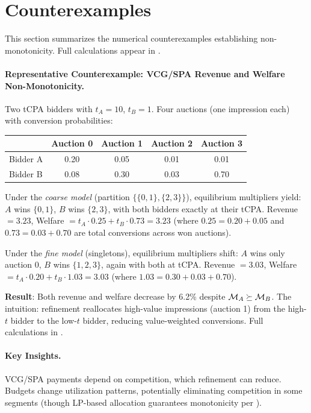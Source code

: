 
\section{Counterexamples}
\label{sec:counterexamples}

This section summarizes the numerical counterexamples establishing non-monotonicity. Full calculations appear in .

\paragraph{Representative Counterexample: VCG/SPA Revenue and Welfare Non-Monotonicity.}
Two tCPA bidders with $t_A = 10$, $t_B = 1$. Four auctions (one impression each) with conversion probabilities:
\begin{center}
\begin{small}
\begin{tabular}{lcccc}
\toprule
& Auction 0 & Auction 1 & Auction 2 & Auction 3 \\
\midrule
Bidder A & 0.20 & 0.05 & 0.01 & 0.01 \\
Bidder B & 0.08 & 0.30 & 0.03 & 0.70 \\
\bottomrule
\end{tabular}
\end{small}
\end{center}

Under the \emph{coarse model} (partition $\{\{0,1\}, \{2,3\}\}$), equilibrium multipliers yield: $A$ wins $\{0,1\}$, $B$ wins $\{2,3\}$, with both bidders exactly at their tCPA. Revenue $= 3.23$, Welfare $= t_A \cdot 0.25 + t_B \cdot 0.73 = 3.23$ (where $0.25 = 0.20{+}0.05$ and $0.73 = 0.03{+}0.70$ are total conversions across won auctions).

Under the \emph{fine model} (singletons), equilibrium multipliers shift: $A$ wins only auction 0, $B$ wins $\{1,2,3\}$, again with both at tCPA. Revenue $= 3.03$, Welfare $= t_A \cdot 0.20 + t_B \cdot 1.03 = 3.03$ (where $1.03 = 0.30{+}0.03{+}0.70$).

\textbf{Result}: Both revenue and welfare decrease by 6.2\% despite $\mathcal{M}_A \succeq \mathcal{M}_B$. The intuition: refinement reallocates high-value impressions (auction 1) from the high-$t$ bidder to the low-$t$ bidder, reducing value-weighted conversions. Full calculations in .

\paragraph{Key Insights.} VCG/SPA payments depend on competition, which refinement can reduce. Budgets change utilization patterns, potentially eliminating competition in some segments (though LP-based allocation guarantees monotonicity per ).
